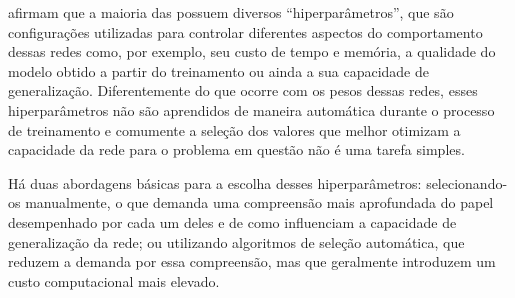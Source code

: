


 afirmam que a maioria das  possuem diversos ``hiperparâmetros'', que são configurações utilizadas para controlar diferentes aspectos do comportamento dessas redes como, por exemplo, seu custo de tempo e memória, a qualidade do modelo obtido a partir do treinamento ou ainda a sua capacidade de generalização. 
Diferentemente do que ocorre com os pesos dessas redes, esses hiperparâmetros não são aprendidos de maneira automática durante o processo de treinamento e comumente a seleção dos valores que melhor otimizam a capacidade da rede para o problema em questão não é uma tarefa simples.

Há duas abordagens básicas para a escolha desses hiperparâmetros: selecionando-os manualmente, o que demanda uma compreensão mais aprofundada do papel desempenhado por cada um deles e de como influenciam a capacidade de generalização da rede; ou utilizando algoritmos de seleção automática, que reduzem a demanda por essa compreensão, mas que geralmente introduzem um custo computacional mais elevado.

